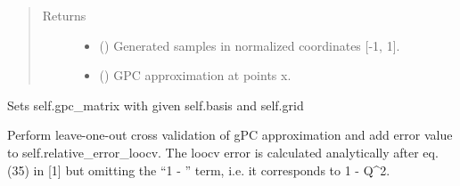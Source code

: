 \documentclass[letterpaper,10pt,english,openany,oneside]{sphinxmanual}
\begin{document}
\begin{fulllineitems}
\begin{fulllineitems}
\begin{quote}
\begin{description}
\begin{itemize}
\end{itemize}

\item[{Returns}] \leavevmode
\begin{itemize}
\item {} 
 () \textendash{} Generated samples in normalized coordinates {[}-1, 1{]}.

\item {} 
 () \textendash{} GPC approximation at points x.

\end{itemize}


\end{description}\end{quote}

\end{fulllineitems}


\begin{fulllineitems}
\label{\detokenize{pygpc:pygpc.GPC.GPC.init_gpc_matrix}}
Sets self.gpc\_matrix with given self.basis and self.grid

\end{fulllineitems}


\begin{fulllineitems}
\label{\detokenize{pygpc:pygpc.GPC.GPC.loocv}}
Perform leave-one-out cross validation of gPC approximation and add error value to self.relative\_error\_loocv.
The loocv error is calculated analytically after eq. (35) in {[}1{]} but omitting the “1 - ” term, i.e. it
corresponds to 1 - Q\textasciicircum{}2.


\end{fulllineitems}
\end{fulllineitems}
\end{document}
